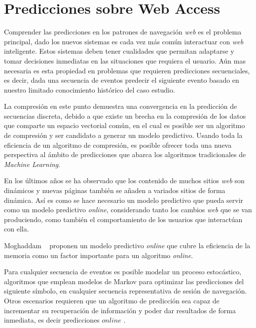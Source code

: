 \chapter[Predicciones sobre Web Access]{Predicciones sobre Web Access} 
\label{ch:predicciones-webaccess}

Comprender las predicciones en los patrones de navegación \emph{web} es el problema principal, dado los nuevos sistemas es cada vez más común interactuar con \emph{web} inteligente. Estos sistemas deben tener cualidades que permitan adaptarse y tomar decisiones inmediatas en las situaciones que requiera el usuario. Aún mas necesaria es esta propiedad en problemas que requieren predicciones secuenciales, es decir, dada una secuencia de eventos  predecir el siguiente evento basado en nuestro limitado conocimiento histórico del caso estudio.

La compresión en este punto demuestra una convergencia en la predicción de secuencias discreta, debido a que existe un brecha en la compresión de los datos que comparte un espacio vectorial común, en el cual es posible ser un  algoritmo de compresión y ser candidato a generar un modelo predictivo. Usando toda la eficiencia de un algoritmo de compresión, es posible ofrecer toda una nueva perspectiva al ámbito de  predicciones que abarca los algoritmos tradicionales de \emph{Machine Learning}. 

En los últimos años se ha observado que  los contenido de muchos sitios \emph{web} son dinámicos y nuevas páginas también se añaden a variados sitios de forma dinámica. Así es como  se hace necesario un modelo predictivo que pueda servir como un modelo predictivo \emph{online},  considerando tanto los cambios \emph{web} que se van produciendo, como también el comportamiento de los usuarios que interactúan con ella. 

Moghaddam \etal~\cite{Moghaddam2009} proponen un modelo predictivo \emph{online} que cubre la eficiencia de la memoria como un factor importante para un algoritmo \emph{online}. 

Para cualquier secuencia de eventos es posible modelar un proceso estocástico, algoritmos que emplean modelos de Markov para optimizar las predicciones del siguiente símbolo, en cualquier secuencia representativa  de sesión de navegación. Otros escenarios requieren que un algoritmo de predicción sea capaz de incrementar su recuperación de información  y poder dar resultados de forma inmediata, es decir predicciones $online$ .

